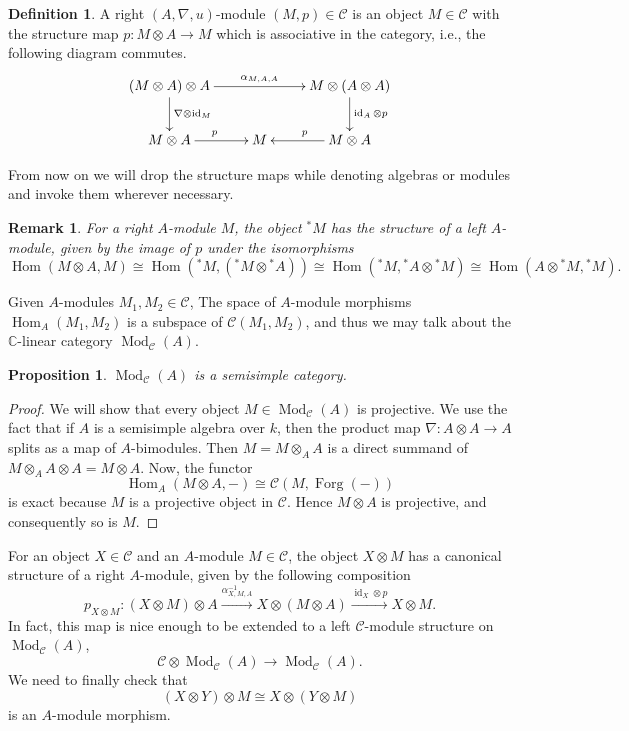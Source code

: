 \documentclass[11pt]{book}
\newtheorem{Prop}[theorem]{Proposition}
\theoremstyle{Rem}
\newtheorem{Rem}[theorem]{Remark}
\theoremstyle{definition}
\newtheorem{Def}[theorem]{Definition}
\numberwithin{equation}{section}
\newcommand\inv{^{-1}}
\newcommand\id{\operatorname{id}}
\newcommand\ot{\otimes}
\newcommand\Hom{\operatorname{Hom}}
\newcommand\Mod{\operatorname{Mod}}
\newcommand\Forg{\operatorname{Forg}}
\newcommand\kk{\mathbb C}
\newcommand\C{\mathcal C}
\begin{document}
\begin{Def}
A right $(A, \nabla, u)$-module  $(M, p) \in \C$ is an object $M\in \C$ with the structure map $p: M \ot A\rightarrow M$ which is associative in the category, i.e., the following diagram commutes. \[
\xymatrix{
	(M \ot A)\ot A \ar[rr]^{\alpha_{M,A,A} } \ar[d]^{\nabla \ot \id_M} & &  M\ot (A \ot A)  \ar[d]^{\id_A \ot p}\\
	 M\ot A \ar[r]^p& M &  M\ot A\ar[l]_p
}
\]
\end{Def}
From now on we will drop the structure maps while denoting algebras or modules and invoke them wherever necessary. 
\begin{Rem}\label{leftmod}
For a right $A$-module $M$, the object ${}^*M$ has the structure of a left $A$-module, given by the image of $p$ under the isomorphisms \begin{equation}
	\Hom(M\ot A, M)\cong \Hom({}^*M, ({}^*M\ot {}^*A)) \cong \Hom({}^*M, {}^*A \ot {}^*M) \cong \Hom(A\ot {}^*M, {}^*M).
\end{equation}
\end{Rem}
Given $A$-modules $M_1,M_2\in \C$, The space of $A$-module morphisms $\Hom_A(M_1, M_2)$ is a subspace of $\C(M_1, M_2)$, and thus we may talk about the $\kk$-linear category $\Mod_\C(A)$. 
\begin{Prop}\label{modcasemisimple}
  $\Mod_\C(A)$ is a semisimple category.
 \end{Prop}
 \begin{proof}
 We will show that every object $M \in \Mod_\C(A)$ is projective. We use the fact that if $A$ is a semisimple algebra over $k$, then the product map $\nabla: A\otimes A \rightarrow A$ splits as a map of $A$-bimodules. Then $M = M\otimes_A A$ is a direct summand of $M\otimes_A A\otimes A= M\otimes A$. Now, the functor \begin{equation}
 	\Hom_A(M \otimes A, -) \cong \C(M, \Forg(-))
 \end{equation}
 is exact because $M$ is a projective object in $\C$. Hence $M\otimes A$ is projective, and consequently so is $M$.
 \end{proof}
 For an object $X \in \C$ and an $A$-module $M\in \C$, the object $X\otimes M$ has a canonical structure of a right $A$-module, given by the following composition \begin{equation}
	p_{X\otimes M}: (X\otimes M) \otimes A  \xrightarrow{\alpha\inv_{X, M, A}} X\otimes (M \otimes A) \xrightarrow{\id_X \otimes p} X\otimes M.
\end{equation}
In fact, this map is nice enough to be extended to a left $\C$-module structure on $\Mod_\C(A)$, \begin{equation}
	\C \otimes \Mod_\C(A) \rightarrow \Mod_\C(A).
\end{equation}
We need to finally check that \begin{equation}
	(X\otimes Y) \otimes M \cong X\ot (Y\otimes M) 
\end{equation} is an $A$-module morphism.
\end{document}
